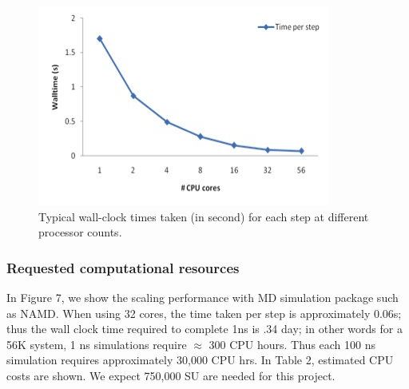 \documentclass[a4paper,10pt]{article}
\begin{document}

\begin{figure}
   \includegraphics[scale=0.660]{56k_scaling-2}
\caption{Typical wall-clock times taken (in second) for each step at different processor counts.}
\end{figure}


\subsubsection*{Requested computational resources}

In Figure 7, we show the scaling performance with MD simulation package such as NAMD.  When using 32 cores, the time taken per step is approximately 0.06s; thus the wall clock time required to complete 1ns is .34 day; in other words for a 56K system, 1 ns simulations require $\approx$ 300 CPU hours. Thus each 100 ns simulation requires approximately 30,000 CPU hrs. In Table 2, estimated CPU costs are shown.  We expect 750,000 SU are needed for this project.
\end{document}
